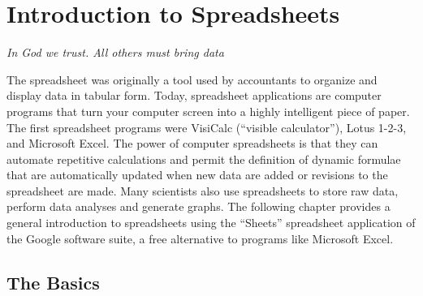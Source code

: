 
\chapter{Introduction to Spreadsheets}
\epigraph{\textit{In God we trust. All others must bring data}}{}
\minitoc
\newpage

The spreadsheet was originally a tool used by accountants to organize and display data in tabular form. Today, spreadsheet applications are computer programs that turn your computer screen into a highly intelligent piece of paper. The first spreadsheet programs were VisiCalc (``visible calculator''), Lotus 1-2-3, and Microsoft Excel. The power of computer spreadsheets is that they can automate repetitive calculations and permit the definition of dynamic formulae that are automatically updated when new data are added or revisions to the spreadsheet are made. Many scientists also use spreadsheets to store raw data, perform data analyses and generate graphs. The following chapter provides a general introduction to spreadsheets using the ``Sheets'' spreadsheet application of the Google software suite, a free alternative to programs like Microsoft Excel. 

\section{The Basics}

